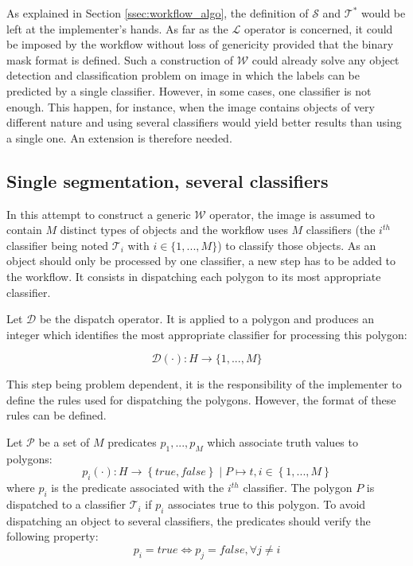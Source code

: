As explained in Section \ref{ssec:workflow_algo}, the definition of $\mathcal{S}$ and $\mathcal{T}^*$ would be left at the implementer's hands. As far as the $\mathcal{L}$ operator is concerned, it could be imposed by the workflow without loss of genericity provided that the binary mask format is defined. Such a construction of $\mathcal{W}$ could already solve any object detection and classification problem on image in which the labels can be predicted by a single classifier. However, in some cases, one classifier is not enough. This happen, for instance, when the image contains objects of very different nature and using several classifiers would yield better results than using a single one. An extension is therefore needed.

\subsection{Single segmentation, several classifiers}
\label{ssec:single_several}

In this attempt to construct a generic $\mathcal{W}$ operator, the image is assumed to contain $M$ distinct types of objects and the workflow uses $M$ classifiers (the $i^{th}$ classifier being noted $\mathcal{T}_i$ with $i \in \{1,...,M\}$) to classify those objects. As an object should only be processed by one classifier, a new step has to be added to the workflow. It consists in dispatching each polygon to its most appropriate classifier. 

\begin{definition}\label{def:dispatch_op} 
	Let $\mathcal{D}$ be the dispatch operator. It is applied to a polygon and produces an integer which identifies the most appropriate classifier for processing this polygon: 

	\begin{equation}
		\mathcal{D}(\cdot) : H \rightarrow \{1,...,M\}
	\end{equation}
\end{definition}

This step being problem dependent, it is the responsibility of the implementer to define the rules used for dispatching the polygons. However, the format of these rules can be defined.

\begin{definition} 
	Let $\mathcal{P}$ be a set of $M$ predicates $p_1, ..., p_M$ which associate truth values to polygons:
	\begin{equation}
		p_i(\cdot) : H \rightarrow \left\{true, false\right\} \mid P \mapsto t, i \in \left\{1,...,M\right\} 
	\end{equation}
	where $p_i$ is the predicate associated with the $i^{th}$ classifier. The polygon $P$ is dispatched to a classifier $\mathcal{T}_i$ if $p_i$ associates true to this polygon. To avoid dispatching an object to several classifiers, the predicates should verify the following property:
	\begin{equation}
		p_i = true \Leftrightarrow p_j = false, \forall j \neq i
	\end{equation} 
\end{definition}

